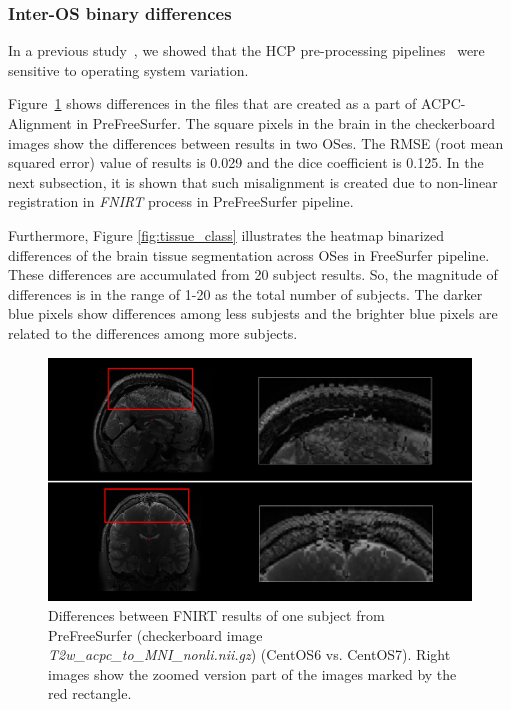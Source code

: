\documentclass[a4paper,num-refs]{oup-contemporary}
\begin{document}
\subsubsection{Inter-OS binary differences}

In a previous study~\cite{Scaria2017}, we showed that the HCP pre-processing 
pipelines~\cite{glasser2013} were 
sensitive to operating system variation. 

Figure~\ref{fig:fnirt_result} shows differences in the files 
that are created as a part of ACPC-Alignment in PreFreeSurfer.
The square pixels in the brain in the checkerboard images show the differences between results in two OSes. 
The RMSE (root mean squared error) value of results is 0.029 and the dice coefficient is 0.125.
In the next subsection, it is shown that such misalignment is created due to 
non-linear registration in \emph{FNIRT} process in PreFreeSurfer pipeline.

Furthermore, Figure 
\ref{fig:tissue_class} illustrates the heatmap binarized differences 
of the brain tissue segmentation across OSes in FreeSurfer pipeline.
These differences are accumulated from 20 subject results.
So, the magnitude of differences is in the range of 1-20 as the total number of subjects.
The darker blue pixels show differences among less subjests and 
the brighter blue pixels are related to the differences among more subjects.



\begin{figure}
  \centering
    \includegraphics[width=\columnwidth]{images/segmentation.png} 
    \caption{Differences between FNIRT results of one subject from PreFreeSurfer 
    (checkerboard image \emph{T2w\_acpc\_to\_MNI\_nonli.nii.gz}) (CentOS6 vs. 
    CentOS7). Right images show the zoomed version part of the images marked 
    by the red rectangle.} 
    \label{fig:fnirt_result}
\end{figure}
\end{document}
